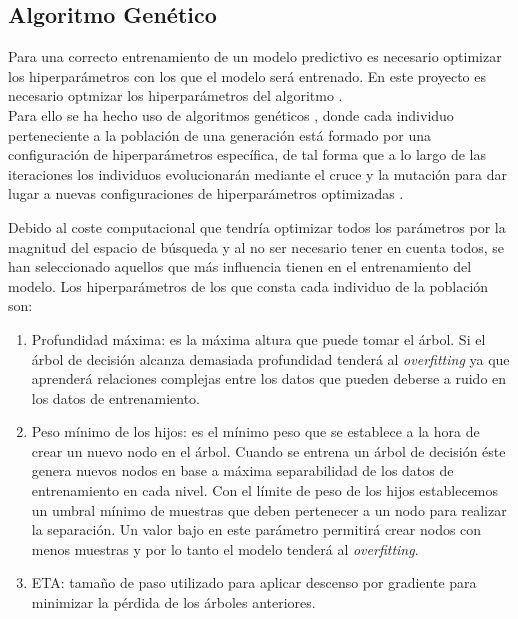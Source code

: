     \subsection{Algoritmo Genético}


        Para una correcto entrenamiento de un modelo predictivo es necesario optimizar los hiperparámetros con los que el modelo será entrenado. En este proyecto es necesario optmizar los hiperparámetros del algoritmo .\\

        Para ello se ha hecho uso de algoritmos genéticos \cite{GAXGBoostCode}, donde cada individuo perteneciente a la población de una generación está formado por una configuración de hiperparámetros específica, de tal forma que a lo largo de las iteraciones los individuos evolucionarán mediante el cruce y la mutación para dar lugar a nuevas configuraciones de hiperparámetros optimizadas \cite{GAXGBoostPaper}.

        Debido al coste computacional que tendría optimizar todos los parámetros por la magnitud del espacio de búsqueda y al no ser necesario tener en cuenta todos, se han seleccionado aquellos que más influencia tienen en el entrenamiento del modelo. Los hiperparámetros de los que consta cada individuo de la población son:

        \begin{enumerate}

            \item Profundidad máxima: es la máxima altura que puede tomar el árbol. Si el árbol de decisión alcanza demasiada profundidad tenderá al \textit{overfitting} ya que aprenderá relaciones complejas entre los datos que pueden deberse a ruido en los datos de entrenamiento.

            \item Peso mínimo de los hijos: es el mínimo peso que se establece a la hora de crear un nuevo nodo en el árbol. Cuando se entrena un árbol de decisión éste genera nuevos nodos en base a máxima separabilidad de los datos de entrenamiento en cada nivel. Con el límite de peso de los hijos establecemos un umbral mínimo de muestras que deben pertenecer a un nodo para realizar la separación. Un valor bajo en este parámetro permitirá crear nodos con menos muestras y por lo tanto el modelo tenderá al \textit{overfitting}.

            \item ETA: tamaño de paso utilizado para aplicar descenso por gradiente para minimizar la pérdida de los árboles anteriores.

        \end{enumerate}

